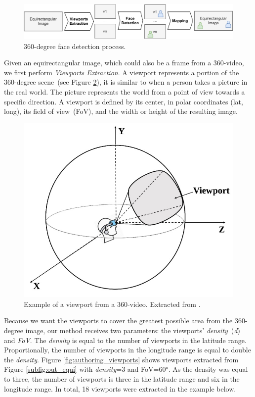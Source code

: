 \begin{figure}[!ht]
    \centering
    \includegraphics[width=1\linewidth]{img/video360/360facedetection.pdf}
    \caption{360-degree face detection process.}
    \label{fig:360_face_detection}
\end{figure}

Given an equirectangular image, which could also be a frame from a 360-video, we first perform \emph{Viewports Extraction}. A viewport represents a portion of the 360-degree scene~(see Figure \ref{fig:authoring_exviewport}), it is similar to when a person takes a picture in the real world. The picture represents the world from a point of view towards a specific direction. A viewport is defined by its center, in polar coordinates (lat, long), its field of view~(FoV), and the width or height of the resulting image.

\begin{figure}[!ht]
    \centering
    \includegraphics[width=0.5\linewidth]{img/video360/viewport.jpg}
    \caption{Example of a viewport from a 360-video. Extracted from \cite{nguyen2020evaluation}.}
    \label{fig:authoring_exviewport}
\end{figure}

Because we want the viewports to cover the greatest possible area from the 360-degree image, our method receives two parameters: the viewports' \emph{density}~(\emph{d}) and \emph{FoV}. The \emph{density} is equal to the number of viewports in the latitude range. Proportionally, the number of viewports in the longitude range is equal to double the \emph{density}. Figure \ref{fig:authoring_viewports} shows viewports extracted from Figure \ref{subfig:out_equi} with \emph{density}=3 and FoV=60°. As the density was equal to three, the number of viewports is three in the latitude range and six in the longitude range. In total, 18 viewports were extracted in the example below.

